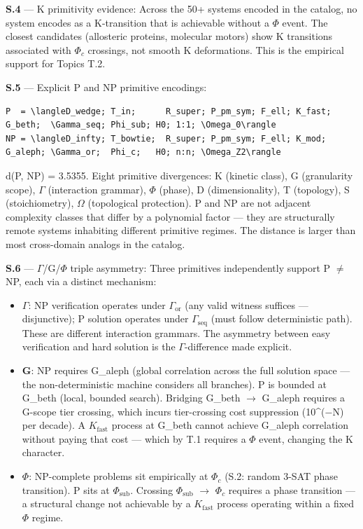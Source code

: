 \documentclass[11pt,a4paper]{article}
\begin{document}
\textbf{S.4} --- K primitivity evidence: Across the 50+ systems encoded in the catalog, no system encodes as a K-transition that is achievable without a $\Phi$ event. The closest candidates (allosteric proteins, molecular motors) show K transitions associated with $\Phi_c$ crossings, not smooth K deformations. This is the empirical support for Topics T.2.

\textbf{S.5} --- Explicit P and NP primitive encodings:

\begin{lstlisting}
P  = \langleD_wedge; T_in;      R_super; P_pm_sym; F_ell; K_fast; G_beth;  \Gamma_seq; Phi_sub; H0; 1:1; \Omega_0\rangle
NP = \langleD_infty; T_bowtie;  R_super; P_pm_sym; F_ell; K_mod;  G_aleph; \Gamma_or;  Phi_c;   H0; n:n; \Omega_Z2\rangle
\end{lstlisting}

d(P, NP) = 3.5355. Eight primitive divergences: K (kinetic class), G (granularity scope), $\Gamma$ (interaction grammar), $\Phi$ (phase), D (dimensionality), T (topology), S (stoichiometry), $\Omega$ (topological protection). P and NP are not adjacent complexity classes that differ by a polynomial factor --- they are structurally remote systems inhabiting different primitive regimes. The distance is larger than most cross-domain analogs in the catalog.

\textbf{S.6} --- $\Gamma$/G/$\Phi$ triple asymmetry: Three primitives independently support P $\neq$ NP, each via a distinct mechanism:

\begin{itemize}
    \item \textbf{$\Gamma$}: NP verification operates under $\Gamma_\text{or}$ (any valid witness suffices --- disjunctive); P solution operates under $\Gamma_\text{seq}$ (must follow deterministic path). These are different interaction grammars. The asymmetry between easy verification and hard solution is the $\Gamma$-difference made explicit.
    \item \textbf{G}: NP requires G\_aleph (global correlation across the full solution space --- the non-deterministic machine considers all branches). P is bounded at G\_beth (local, bounded search). Bridging G\_beth $\to$ G\_aleph requires a G-scope tier crossing, which incurs tier-crossing cost suppression (10\^{}($-$N) per decade). A $K_\text{fast}$ process at G\_beth cannot achieve G\_aleph correlation without paying that cost --- which by T.1 requires a $\Phi$ event, changing the K character.
    \item \textbf{$\Phi$}: NP-complete problems sit empirically at $\Phi_c$ (S.2: random 3-SAT phase transition). P sits at $\Phi_\text{sub}$. Crossing $\Phi_\text{sub}$ $\to$ $\Phi_c$ requires a phase transition --- a structural change not achievable by a $K_\text{fast}$ process operating within a fixed $\Phi$ regime.
\end{itemize}
\end{document}
